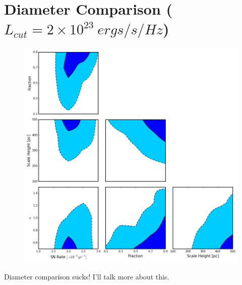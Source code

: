 \documentclass[10pt,a4paper]{article}
\begin{document}
\section* {Diameter Comparison ($L_{cut} = 2 \times 10^{23}\ ergs/s/Hz$)}
\begin{figure}[h!]
\includegraphics[width=15cm]{TrianglePlot_Diams.png}
\caption{}
\end{figure}
Diameter comparison sucks! I'll talk more about this.
\newpage
\end{document}
